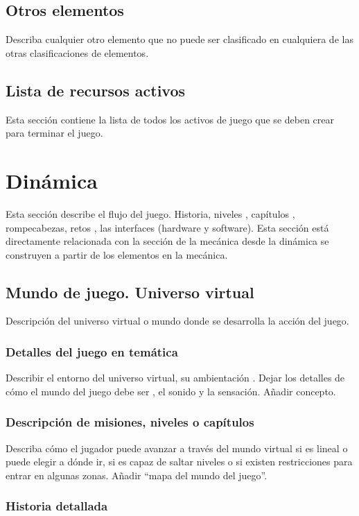 \subsection{Otros elementos}
Describa cualquier otro elemento que no puede ser clasificado en cualquiera de las otras clasificaciones de elementos.

\subsection{Lista de recursos activos}
Esta sección contiene la lista de todos los activos de juego que se deben crear para terminar el juego.


\section{Dinámica}
Esta sección describe el flujo del juego. Historia, niveles , capítulos , rompecabezas, retos , las interfaces (hardware y software). Esta sección está directamente relacionada con la sección de la mecánica desde la dinámica se construyen a partir de los elementos en la mecánica.

\subsection{Mundo de juego. Universo virtual}
Descripción del universo virtual o mundo donde se desarrolla la acción del juego.

\subsubsection{Detalles del juego en temática}
Describir el entorno del universo virtual, su ambientación . Dejar los detalles de cómo el mundo del juego debe ser , el sonido y la sensación. Añadir concepto.

\subsubsection{Descripción de misiones, niveles o capítulos}
Describa cómo el jugador puede avanzar a través del mundo virtual si es lineal o puede elegir a dónde ir, si es capaz de saltar niveles o si existen restricciones para entrar en algunas zonas. Añadir “mapa del mundo del juego”.

\subsubsection{Historia detallada}



